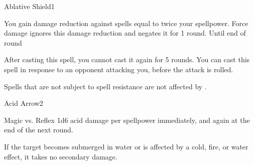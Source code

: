 \begin{spellsection}{Ablative Shield}{1}

    \begin{spellheader}
    \end{spellheader}
    \begin{spellcontent}
        \begin{spelltargetinginfo}
        \end{spelltargetinginfo}
        \begin{spelleffects}
            \spelleffect You gain damage reduction against spells equal to twice your spellpower. Force damage ignores this damage reduction and negates it for 1 round.
            \spelldur Until end of round
        \end{spelleffects}
    \end{spellcontent}
    \begin{spellfooter}
        \spellnotes After casting this spell, you cannot cast it again for 5 rounds. You can cast this spell in response to an opponent attacking you, before the attack is rolled.

        Spells that are not subject to spell resistance are not affected by .
        \miscastexplode
    \end{spellfooter}
\end{spellsection}

\begin{spellsection}{Acid Arrow}{2}
    \begin{spellheader}
    \end{spellheader}
    \begin{spellcontent}
        \begin{spelltargetinginfo}
        \end{spelltargetinginfo}
        \begin{spelleffects}
            \begin{spellattack}{Magic vs. Reflex}
                \spellsuccess 1d6 acid damage per spellpower immediately, and again at the end of the next round.
            \end{spellattack}
        \end{spelleffects}
    \end{spellcontent}
    \begin{spellfooter}
        \spellnotes If the target becomes submerged in water or is affected by a cold, fire, or water effect, it takes no secondary damage.

        \physicalspellnotes
        \miscastrandom
    \end{spellfooter}
\end{spellsection}

